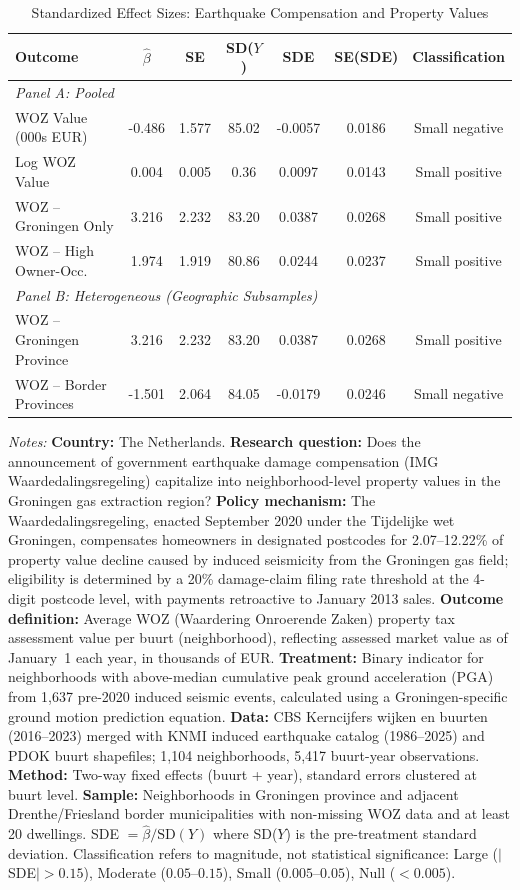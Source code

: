 \begin{table}[htbp]
\centering
\caption{Standardized Effect Sizes: Earthquake Compensation and Property Values}
\label{tab:sde}
\small
\begin{tabular}{lcccccc}
\hline\hline
Outcome & $\hat{\beta}$ & SE & SD($Y$) & SDE & SE(SDE) & Classification \\
\hline
\multicolumn{7}{l}{\textit{Panel A: Pooled}} \\[3pt]
WOZ Value (000s EUR) & -0.486 & 1.577 & 85.02 & -0.0057 & 0.0186 & Small negative \\
Log WOZ Value & 0.004 & 0.005 & 0.36 & 0.0097 & 0.0143 & Small positive \\
WOZ -- Groningen Only & 3.216 & 2.232 & 83.20 & 0.0387 & 0.0268 & Small positive \\
WOZ -- High Owner-Occ. & 1.974 & 1.919 & 80.86 & 0.0244 & 0.0237 & Small positive \\
\hline
\multicolumn{7}{l}{\textit{Panel B: Heterogeneous (Geographic Subsamples)}} \\[3pt]
WOZ -- Groningen Province & 3.216 & 2.232 & 83.20 & 0.0387 & 0.0268 & Small positive \\
WOZ -- Border Provinces & -1.501 & 2.064 & 84.05 & -0.0179 & 0.0246 & Small negative \\
\hline\hline
\end{tabular}
\begin{tablenotes}[flushleft]
\small
\item \textit{Notes:} \textbf{Country:} The Netherlands. \textbf{Research question:} Does the announcement of government earthquake damage compensation (IMG Waardedalingsregeling) capitalize into neighborhood-level property values in the Groningen gas extraction region? \textbf{Policy mechanism:} The Waardedalingsregeling, enacted September 2020 under the Tijdelijke wet Groningen, compensates homeowners in designated postcodes for 2.07--12.22\% of property value decline caused by induced seismicity from the Groningen gas field; eligibility is determined by a 20\% damage-claim filing rate threshold at the 4-digit postcode level, with payments retroactive to January 2013 sales. \textbf{Outcome definition:} Average WOZ (Waardering Onroerende Zaken) property tax assessment value per buurt (neighborhood), reflecting assessed market value as of January~1 each year, in thousands of EUR. \textbf{Treatment:} Binary indicator for neighborhoods with above-median cumulative peak ground acceleration (PGA) from 1,637 pre-2020 induced seismic events, calculated using a Groningen-specific ground motion prediction equation. \textbf{Data:} CBS Kerncijfers wijken en buurten (2016--2023) merged with KNMI induced earthquake catalog (1986--2025) and PDOK buurt shapefiles; 1,104 neighborhoods, 5,417 buurt-year observations. \textbf{Method:} Two-way fixed effects (buurt + year), standard errors clustered at buurt level. \textbf{Sample:} Neighborhoods in Groningen province and adjacent Drenthe/Friesland border municipalities with non-missing WOZ data and at least 20 dwellings. SDE $= \hat{\beta} / \text{SD}(Y)$ where SD($Y$) is the pre-treatment standard deviation. Classification refers to magnitude, not statistical significance: Large ($|$SDE$| > 0.15$), Moderate ($0.05$--$0.15$), Small ($0.005$--$0.05$), Null ($< 0.005$).

\end{tablenotes}
\end{table}
